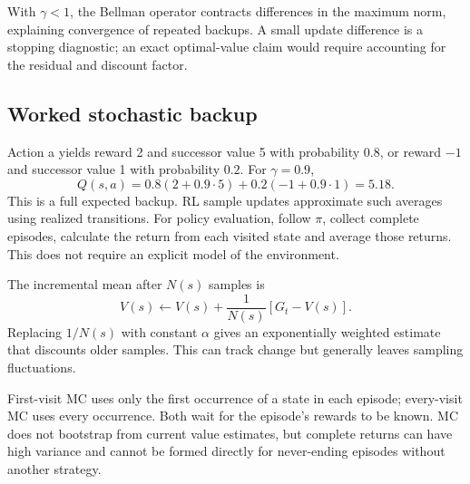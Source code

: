 \documentclass[11pt]{article}
\begin{document}
With $\gamma<1$, the Bellman operator contracts differences in the maximum norm, explaining convergence of repeated backups. A small update difference is a stopping diagnostic; an exact optimal-value claim would require accounting for the residual and discount factor.
\subsection{Worked stochastic backup}
Action a yields reward 2 and successor value 5 with probability $0.8$, or reward $-1$ and successor value 1 with probability $0.2$. For $\gamma=0.9$,
\[
Q(s,a)=0.8(2+0.9\cdot5)+0.2(-1+0.9\cdot1)=5.18.
\]
This is a full expected backup. RL sample updates approximate such averages using realized transitions.
For policy evaluation, follow $\pi$, collect complete episodes, calculate the return from each visited state and average those returns. This does not require an explicit model of the environment.

The incremental mean after $N(s)$ samples is
\[
V(s)\leftarrow V(s)+\frac1{N(s)}[G_t-V(s)].
\]
Replacing $1/N(s)$ with constant $\alpha$ gives an exponentially weighted estimate that discounts older samples. This can track change but generally leaves sampling fluctuations.

First-visit MC uses only the first occurrence of a state in each episode; every-visit MC uses every occurrence. Both wait for the episode's rewards to be known. MC does not bootstrap from current value estimates, but complete returns can have high variance and cannot be formed directly for never-ending episodes without another strategy.
\end{document}
